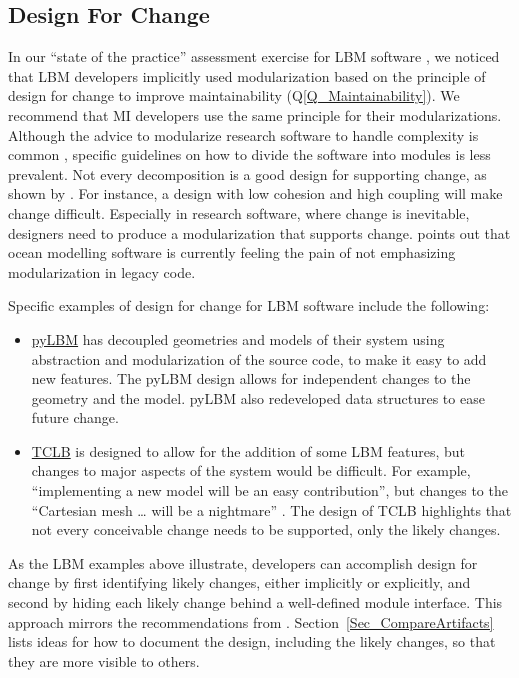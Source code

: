 \documentclass[final, 12pt, 3p, times]{elsarticle}
\newcommand{\qref}[1]{Q\ref{#1}}
\begin{document}
\subsection{Design For Change} \label{Sec_DesForChange}

In our ``state of the practice'' assessment exercise for LBM software
\cite{SmithEtAl2024}, we noticed that LBM developers implicitly used
modularization based on the principle of design for change to improve
maintainability (\qref{Q_Maintainability}).  We recommend that MI developers use
the same principle for their modularizations.  Although the advice to modularize
research software to handle complexity is common \cite{WilsonEtAl2014,
StewartEtAl2017, Storer2017}, specific guidelines on how to divide the software
into modules is less prevalent.  Not every decomposition is a good design for
supporting change, as shown by \cite{Parnas1972a}.  For instance, a design with
low cohesion and high coupling \cite[p.\ 48]{GhezziEtAl2003} will make change
difficult. Especially in research software, where change is inevitable,
designers need to produce a modularization that supports change.
\cite{JungEtAl2022} points out that ocean modelling software is currently
feeling the pain of not emphasizing modularization in legacy code.

Specific examples of design for change for LBM software \cite{SmithEtAl2024}
include the following:

\begin{itemize}
\item \href{https://github.com/pylbm/pylbm}{pyLBM} has decoupled geometries and
models of their system using abstraction and modularization of the source code,
to make it easy to add new features.  The pyLBM design allows for independent
changes to the geometry and the model.  pyLBM also redeveloped data structures
to ease future change. 
\item \href{https://github.com/CFD-GO/TCLB}{TCLB} \cite{rokicki2016adjoint} is
designed to allow for the addition of some LBM features, but changes to major
aspects of the system would be difficult. For example, ``implementing a new
model will be an easy contribution'', but changes to the ``Cartesian mesh … will
be a nightmare'' \cite{SmithEtAl2024}. The design of TCLB highlights that not
every conceivable change needs to be supported, only the likely changes.  
\end{itemize}

As the LBM examples above illustrate, developers can accomplish design for
change by first identifying likely changes, either implicitly or explicitly, and
second by hiding each likely change behind a well-defined module interface. This
approach mirrors the recommendations from \cite{Parnas1972a}.
Section~\ref{Sec_CompareArtifacts} lists ideas for how to document the design,
including the likely changes, so that they are more visible to others.
\end{document}
